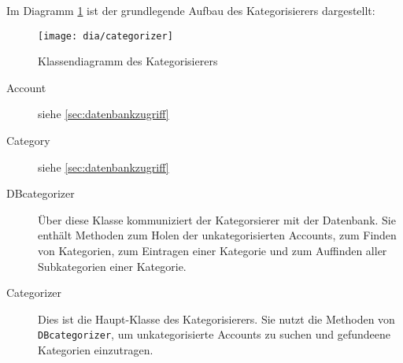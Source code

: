 Im Diagramm \ref{fig:categorizer} ist der grundlegende Aufbau des Kategorisierers dargestellt:
\begin{figure}[h!]
	\centering
	\texttt{[image: dia/categorizer]}
	\caption{Klassendiagramm des Kategorisierers}
	\label{fig:categorizer}
\end{figure}
\begin{description}
	\item[Account] siehe \cref{sec:datenbankzugriff}
	\item[Category] siehe \cref{sec:datenbankzugriff}
	\item[DBcategorizer] Über diese Klasse kommuniziert der Kategorsierer mit der Datenbank. Sie enthält Methoden zum Holen der unkategorisierten Accounts, zum Finden von Kategorien, zum Eintragen einer Kategorie und zum Auffinden aller Subkategorien einer Kategorie.
	\item[Categorizer] Dies ist die Haupt-Klasse des Kategorisierers. Sie nutzt die Methoden von \lstinline{DBcategorizer}, um unkategorisierte Accounts zu suchen und gefundeene Kategorien einzutragen.
\end{description}

